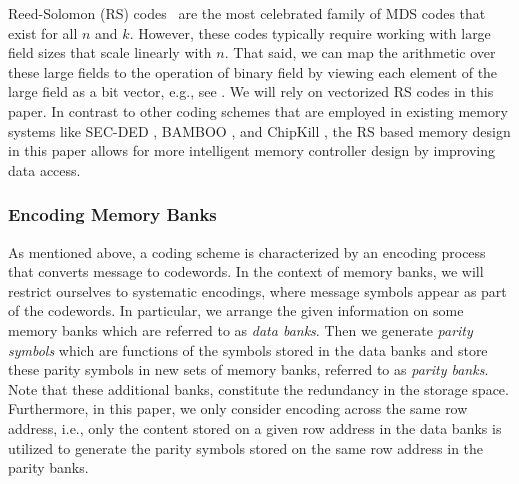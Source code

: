 Reed-Solomon (RS) codes~\cite{RS1960} are the most celebrated family of MDS codes that exist for all $n$ and $k$. However, these codes typically require working with large field sizes that scale linearly with $n$. That said, we can map the arithmetic over these large fields to the operation of binary field by viewing each element of the large field as a bit vector, e.g., see \cite{shanmugam, GW16}. We will rely on vectorized RS codes in this paper. In contrast to other coding schemes that are employed in existing memory systems like SEC-DED \cite{intel}, BAMBOO \cite{kim}, and ChipKill \cite{ibm}, the RS based memory design in this paper allows for more intelligent memory controller design by improving data access.

\subsubsection{Encoding Memory Banks}
\label{sec:encoding}

As mentioned above, a coding scheme is characterized by an encoding process that converts message to codewords. In the context of memory banks, we will restrict ourselves to systematic encodings, where message symbols appear as part of the codewords. In particular, we arrange the given information on some memory banks which are referred to as {\em data banks}. Then we generate {\em parity symbols} which are functions of the symbols stored in the data banks and store these parity symbols in new sets of memory banks, referred to as {\em parity banks}. Note that these additional banks, constitute the redundancy in the storage space. Furthermore, in this paper, we only consider encoding across the same row address, i.e., only the content stored on a given row address in the data banks is utilized to generate the parity symbols stored on the same row address in the parity banks.

